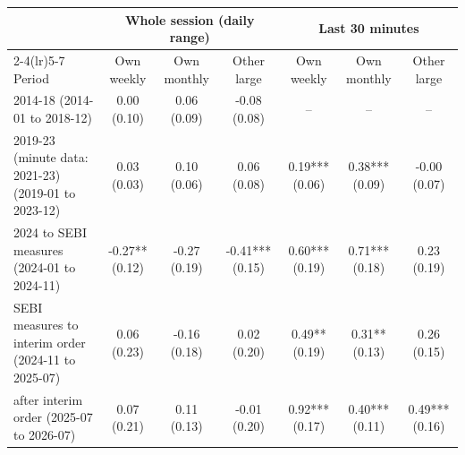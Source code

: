 \begin{tabular}{lcccccc}
\toprule
 & \multicolumn{3}{c}{Whole session (daily range)} & \multicolumn{3}{c}{Last 30 minutes} \\
\cmidrule(lr){2-4}\cmidrule(lr){5-7}
Period & Own weekly & Own monthly & Other large & Own weekly & Own monthly & Other large \\
\midrule
2014-18 (2014-01 to 2018-12) & 0.00 (0.10) & 0.06 (0.09) & -0.08 (0.08) & -- & -- & -- \\
2019-23 (minute data: 2021-23) (2019-01 to 2023-12) & 0.03 (0.03) & 0.10 (0.06) & 0.06 (0.08) & 0.19*** (0.06) & 0.38*** (0.09) & -0.00 (0.07) \\
2024 to SEBI measures (2024-01 to 2024-11) & -0.27** (0.12) & -0.27 (0.19) & -0.41*** (0.15) & 0.60*** (0.19) & 0.71*** (0.18) & 0.23 (0.19) \\
SEBI measures to interim order (2024-11 to 2025-07) & 0.06 (0.23) & -0.16 (0.18) & 0.02 (0.20) & 0.49** (0.19) & 0.31** (0.13) & 0.26 (0.15) \\
after interim order (2025-07 to 2026-07) & 0.07 (0.21) & 0.11 (0.13) & -0.01 (0.20) & 0.92*** (0.17) & 0.40*** (0.11) & 0.49*** (0.16) \\
\bottomrule
\end{tabular}